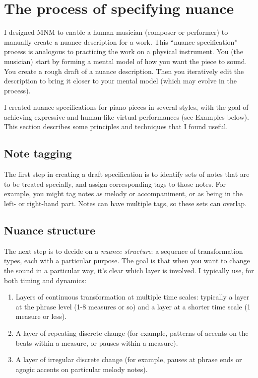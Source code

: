 \documentclass[letterpaper, 12pt]{article}
\begin{document}
\section{The process of specifying nuance}

I designed MNM to enable a human musician (composer or performer)
to manually create a nuance description for a work.
This ``nuance specification'' process
is analogous to practicing the work on a physical instrument.
You (the musician)
start by forming a mental model of how you want the piece to sound.
You create a rough draft of a nuance description.
Then you iteratively edit the description
to bring it closer to your mental model
(which may evolve in the process).

I created nuance specifications for piano pieces in several styles,
with the goal of achieving expressive and human-like virtual performances
(see Examples below).
This section
describes some principles and techniques that I found useful.

\subsection{Note tagging}

The first step in creating a draft specification
is to identify sets of notes that are to be treated specially,
and assign corresponding tags to those notes.
For example, you might tag notes as melody or accompaniment,
or as being in the left- or right-hand part.
Notes can have multiple tags, so these sets can overlap.

\subsection{Nuance structure}

The next step is to decide on a \textit{nuance structure}:
a sequence of transformation types, each with a particular purpose.
The goal is that when you want to change the sound in a particular way,
it's clear which layer is involved.
I typically use, for both timing and dynamics:
\begin{enumerate}
\item Layers of continuous transformation at multiple time scales:
typically a layer at the phrase level (1-8 measures or so)
and a layer at a shorter time scale (1 measure or less).
\item A layer of repeating discrete change
(for example, patterns of accents on the beats within a measure,
or pauses within a measure).
\item A layer of irregular discrete change
(for example, pauses at phrase ends
or agogic accents on particular melody notes).
\end{enumerate}
\end{document}
